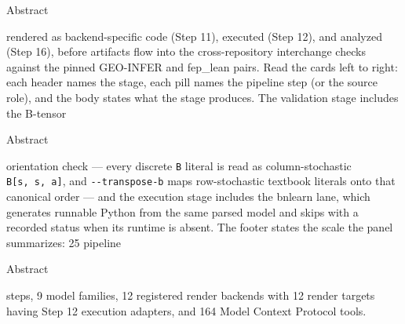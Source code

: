 \documentclass[
  ignorenonframetext,
]{beamer}
\newenvironment{archivecaptionframe}{\par\begingroup}{\par\endgroup}
\begin{document}
\begin{frame}{Abstract}

\begin{archivecaptionframe}

rendered as backend-specific code (Step 11), executed (Step 12), and
analyzed (Step 16), before artifacts flow into the cross-repository
interchange checks against the pinned GEO-INFER and fep\_lean pairs.
Read the cards left to right: each header names the stage, each pill
names the pipeline step (or the source role), and the body states what
the stage produces. The validation stage includes the B-tensor

\end{archivecaptionframe}

\end{frame}

\begin{frame}{Abstract}

\begin{archivecaptionframe}

orientation check --- every discrete \texttt{B} literal is read as
column-stochastic \texttt{B{[}s\textquotesingle{},\ s,\ a{]}}, and
\texttt{-\/-transpose-b} maps row-stochastic textbook literals onto that
canonical order --- and the execution stage includes the bnlearn lane,
which generates runnable Python from the same parsed model and skips
with a recorded status when its runtime is absent. The footer states the
scale the panel summarizes: 25 pipeline

\end{archivecaptionframe}

\end{frame}

\begin{frame}{Abstract}

\begin{archivecaptionframe}

steps, 9 model families, 12 registered render backends with 12 render
targets having Step 12 execution adapters, and 164 Model Context
Protocol tools.

\end{archivecaptionframe}

\end{frame}
\end{document}
